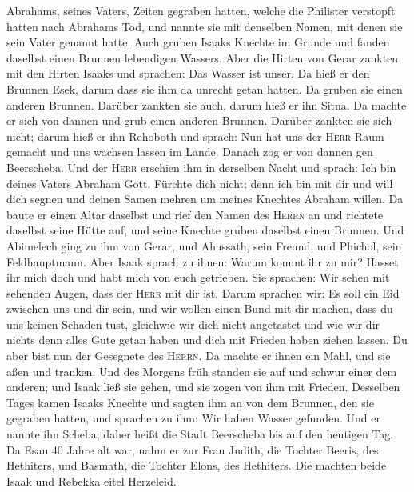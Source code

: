 Abrahams, seines Vaters, Zeiten gegraben hatten, welche die Philister
verstopft hatten nach Abrahams Tod, und nannte sie mit denselben Namen,
mit denen sie sein Vater genannt hatte.  Auch gruben
Isaaks Knechte im Grunde und fanden daselbst einen Brunnen lebendigen
Wassers.  Aber die Hirten von Gerar zankten mit den
Hirten Isaaks und sprachen: Das Wasser ist unser. Da hieß er den Brunnen
Esek, darum dass sie ihm da unrecht getan hatten.  Da
gruben sie einen anderen Brunnen. Darüber zankten sie auch, darum hieß
er ihn Sitna.  Da machte er sich von dannen und grub
einen anderen Brunnen. Darüber zankten sie sich nicht; darum hieß er ihn
Rehoboth und sprach: Nun hat uns der \textsc{Herr} Raum gemacht und uns
wachsen lassen im Lande.  Danach zog er von dannen gen
Beerscheba.  Und der \textsc{Herr} erschien ihm in
derselben Nacht und sprach: Ich bin deines Vaters Abraham Gott. Fürchte
dich nicht; denn ich bin mit dir und will dich segnen und deinen Samen
mehren um meines Knechtes Abraham willen.  Da baute er
einen Altar daselbst und rief den Namen des \textsc{Herrn} an und
richtete daselbst seine Hütte auf, und seine Knechte gruben daselbst
einen Brunnen.  Und Abimelech ging zu ihm von Gerar, und
Ahussath, sein Freund, und Phichol, sein Feldhauptmann. 
Aber Isaak sprach zu ihnen: Warum kommt ihr zu mir? Hasset ihr mich doch
und habt mich von euch getrieben.  Sie sprachen: Wir
sehen mit sehenden Augen, dass der \textsc{Herr} mit dir ist. Darum
sprachen wir: Es soll ein Eid zwischen uns und dir sein, und wir wollen
einen Bund mit dir machen,  dass du uns keinen Schaden
tust, gleichwie wir dich nicht angetastet und wie wir dir nichts denn
alles Gute getan haben und dich mit Frieden haben ziehen lassen. Du aber
bist nun der Gesegnete des \textsc{Herrn}.  Da machte er
ihnen ein Mahl, und sie aßen und tranken.  Und des
Morgens früh standen sie auf und schwur einer dem anderen; und Isaak
ließ sie gehen, und sie zogen von ihm mit Frieden. 
Desselben Tages kamen Isaaks Knechte und sagten ihm an von dem Brunnen,
den sie gegraben hatten, und sprachen zu ihm: Wir haben Wasser gefunden.
 Und er nannte ihn Scheba; daher heißt die Stadt
Beerscheba bis auf den heutigen Tag.  Da Esau 40 Jahre
alt war, nahm er zur Frau Judith, die Tochter Beeris, des Hethiters, und
Basmath, die Tochter Elons, des Hethiters.  Die machten
beide Isaak und Rebekka eitel Herzeleid.

